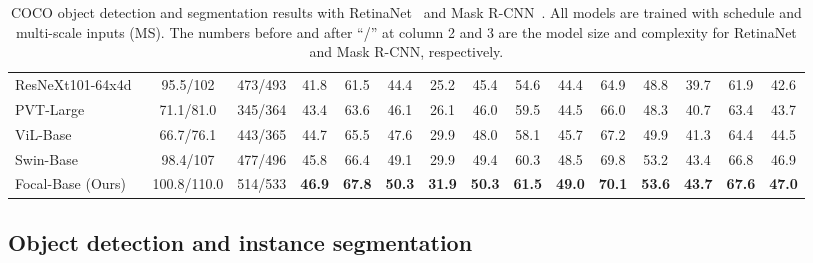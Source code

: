 \documentclass{article}
\begin{document}
\begin{table}[!ht]
\begin{center}
{\begin{tabular}{l|cc|cccccc|cccccc}
\midrule
ResNeXt101-64x4d~\cite{xie2017aggregated} & 95.5/102 & 473/493 & 41.8 & 61.5 & 44.4 & 25.2 & 45.4 & 54.6 & 44.4 & 64.9 & 48.8 & 39.7 & 61.9 & 42.6 \\
PVT-Large\cite{wang2021pyramid} & 71.1/81.0 & 345/364 & 43.4 & 63.6 & 46.1 & 26.1 & 46.0 & 59.5 & 44.5 & 66.0 & 48.3 & 40.7 & 63.4 & 43.7 \\
ViL-Base~\cite{zhang2021multi} & 66.7/76.1 & 443/365 & 44.7 & 65.5 & 47.6 & 29.9 & 48.0 & 58.1 & 45.7 & 67.2 & 49.9 & 41.3 & 64.4 & 44.5 \\
Swin-Base~\cite{liu2021swin} & 98.4/107 & 477/496 & 45.8 & 66.4 & 49.1 & 29.9 & 49.4 & 60.3 & 48.5 & 69.8 & 53.2 & 43.4 & 66.8 & 46.9 \\
\rowcolor{Gray}
Focal-Base (Ours) & 100.8/110.0 & 514/533 & \textbf{46.9} & \textbf{67.8} & \textbf{50.3} & \textbf{31.9} & \textbf{50.3} & \textbf{61.5} & \textbf{49.0} & \textbf{70.1} & \textbf{53.6} & \textbf{43.7} & \textbf{67.6} & \textbf{47.0} \\
\bottomrule
\end{tabular}}
\end{center}
\vspace{2pt}
\caption{COCO object detection and segmentation results with RetinaNet~\cite{lin2017focal} and Mask R-CNN~\cite{he2016deep}. All models are trained with  schedule and multi-scale inputs (MS). The numbers before and after ``/'' at column 2 and 3 are the model size and complexity for RetinaNet and Mask R-CNN, respectively.}
\label{tab:object_detection_3x}
\vspace{-2mm}
\end{table}


\subsection{Object detection and instance segmentation}
\end{document}
